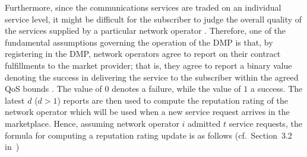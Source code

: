 Furthermore, since the communications services are traded on an individual service level, it might be difficult for the subscriber to judge the overall quality of the services supplied by a particular network operator \cite{DMIrvine02}. Therefore, one of the fundamental assumptions governing the operation of the DMP is that, by registering in the DMP, network operators agree to report on their contract fulfillments to the market provider; that is, they agree to report a binary value denoting the success in delivering the service to the subscriber within the agreed QoS bounds \cite{DMLeBodic00}. The value of $0$ denotes a failure, while the value of $1$ a success. The latest $d$ ($d>1$) reports are then used to compute the reputation rating of the network operator which will be used when a new service request arrives in the marketplace. Hence, assuming network operator $i$ admitted $t$ service requests, the formula for computing a reputation rating update is as follows (cf.~Section~3.2 in~\cite{DMLeBodic00})
